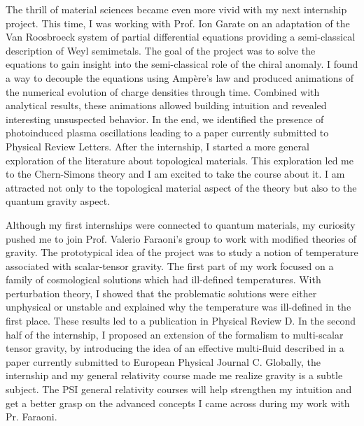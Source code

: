 \documentclass[12pt]{article}
\begin{document}
\vspace{0.3cm} 

The thrill of material sciences became even more vivid with my next internship project. This time, I was working with Prof. Ion Garate on an adaptation of the Van Roosbroeck system of partial differential equations providing a semi-classical description of Weyl semimetals. The goal of the project was to solve the equations to gain insight into the semi-classical role of the chiral anomaly. I found a way to decouple the equations using Ampère's law and produced animations of the numerical evolution of charge densities through time. Combined with analytical results, these animations allowed building intuition and revealed interesting unsuspected behavior. In the end, we identified the presence of photoinduced plasma oscillations leading to a paper currently submitted to Physical Review Letters. After the internship, I started a more general exploration of the literature about topological materials. This exploration led me to the Chern-Simons theory and I am excited to take the course about it. I am attracted not only to the topological material aspect of the theory but also to the quantum gravity aspect.    \vspace{0.3cm}   

\newpage 

Although my first internships were connected to quantum materials, my curiosity pushed me to join Prof. Valerio Faraoni's group to work with modified theories of gravity. The prototypical idea of the project was to study a notion of temperature associated with scalar-tensor gravity. The first part of my work focused on a family of cosmological solutions which had ill-defined temperatures. With perturbation theory, I showed that the problematic solutions were either unphysical or unstable and explained why the temperature was ill-defined in the first place. These results led to a publication in Physical Review D. In the second half of the internship, I proposed an extension of the formalism to multi-scalar tensor gravity, by introducing the idea of an effective multi-fluid described in a paper currently submitted to European Physical Journal C. Globally, the internship and my general relativity course made me realize gravity is a subtle subject. The PSI general relativity courses will help strengthen my intuition and get a better grasp on the advanced concepts I came across during my work with Pr. Faraoni. \vspace{0.3cm}   
\end{document}
